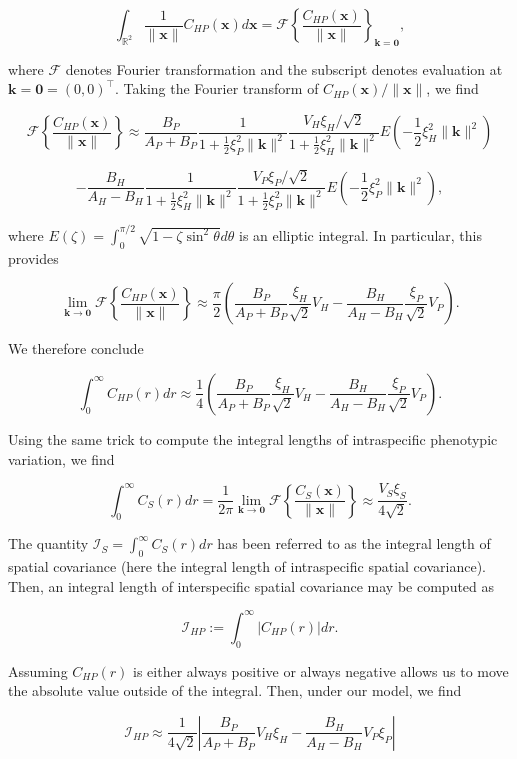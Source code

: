 \documentclass{article}
\begin{document}
\[\int_{\mathbb R^2}\frac{1}{\|\pmb x\|}C_{HP}(\pmb x)d\pmb x=\mathcal F\left\{\frac{C_{HP}(\pmb x)}{\|\pmb x\|}\right\}_{\pmb k=\pmb 0},\]

where \(\mathcal F\) denotes Fourier transformation and the subscript
denotes evaluation at \(\pmb k=\pmb 0=(0,0)^\top\). Taking the Fourier
transform of \(C_{HP}(\pmb x)/\|\pmb x\|\), we find

\[\mathcal F\left\{\frac{C_{HP}(\pmb x)}{\|\pmb x\|}\right\}\approx\frac{B_P}{A_P+B_P}\frac{1}{1+\frac{1}{2}\xi_P^2\|\pmb k\|^2} \frac{V_H\xi_H/\sqrt2}{1+\frac{1}{2}\xi_H^2\|\pmb k\|^2}E\left(-\frac{1}{2}\xi_H^2\|\pmb k\|^2\right)\]

\[-\frac{B_H}{A_H-B_H}\frac{1}{1+\frac{1}{2}\xi_H^2\|\pmb k\|^2} \frac{V_P\xi_P/\sqrt2}{1+\frac{1}{2}\xi_P^2\|\pmb k\|^2}E\left(-\frac{1}{2}\xi_P^2\|\pmb k\|^2\right),\]

where \(E(\zeta)=\int_0^{\pi/2}\sqrt{1-\zeta\sin^2\theta}d\theta\) is an
elliptic integral. In particular, this provides

\[\lim_{\pmb k\to\pmb 0}\mathcal F\left\{\frac{C_{HP}(\pmb x)}{\|\pmb x\|}\right\}\approx\frac{\pi}{2}\left(\frac{B_P}{A_P+B_P}\frac{\xi_H}{\sqrt2}V_H-\frac{B_H}{A_H-B_H}\frac{\xi_P}{\sqrt2}V_P\right).\]

We therefore conclude

\[\int_0^\infty C_{HP}(r)dr\approx\frac{1}{4}\left(\frac{B_P}{A_P+B_P}\frac{\xi_H}{\sqrt2}V_H-\frac{B_H}{A_H-B_H}\frac{\xi_P}{\sqrt2}V_P\right).\]

Using the same trick to compute the integral lengths of intraspecific
phenotypic variation, we find

\[\int_0^\infty C_S(r)dr=\frac{1}{2\pi}\lim_{\pmb k\to\pmb 0}\mathcal F\left\{\frac{C_S(\pmb x)}{\|\pmb x\|}\right\}\approx\frac{V_S\xi_S}{4\sqrt2}.\]

The quantity \(\mathcal I_S=\int_0^\infty C_S(r)dr\) has been referred
to as the integral length of spatial covariance (here the integral
length of intraspecific spatial covariance). Then, an integral length of
interspecific spatial covariance may be computed as

\[\mathcal I_{HP}:=\int_0^\infty |C_{HP}(r)|dr.\]

Assuming \(C_{HP}(r)\) is either always positive or always negative
allows us to move the absolute value outside of the integral. Then,
under our model, we find

\[\mathcal I_{HP}\approx\frac{1}{4\sqrt2}\left|\frac{B_P}{A_P+B_P}V_H\xi_H-\frac{B_H}{A_H-B_H}V_P\xi_P\right|\]
\end{document}
